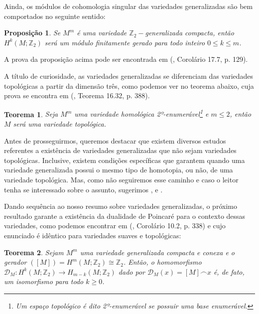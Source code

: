 \documentclass[12pt,oneside]{book} %
\newtheorem{teo}    {\hspace{0.5cm}Teorema}[chapter]
\newtheorem{prop}   {\hspace{0.5cm}Proposi\c c\~ao}[chapter]
\newcommand{\Z}{\mathbb{Z}}
\newcommand{\ccap}{\frown}
\begin{document}
\par Ainda, os módulos de cohomologia singular das variedades generalizadas são bem comportados no seguinte sentido:

\begin{prop}
Se $M^{m}$ é uma variedade $\Z_{2}-$generalizada compacta, então $H^{k}(M;\Z_{2})$ será um módulo finitamente gerado para todo inteiro $0\leq k\leq m$.
\end{prop}

\par A prova da proposição acima pode ser encontrada em (\cite{bredon_2}, Corolário 17.7, p. 129).

\par A título de curiosidade, as variedades generalizadas se diferenciam das variedades topológicas a partir da dimensão três, como podemos ver no teorema abaixo, cuja prova se encontra em (\cite{bredon_2}, Teorema 16.32, p. 388).

\begin{teo}
Seja $M^{m}$ uma variedade homológica 2º-enumerável\footnote{Um espaço topológico é dito 2º-enumerável se possuir uma base enumerável.} e $m\leq 2$, então $M$ será uma variedade topológica.
\end{teo}

\par Antes de prosseguirmos, queremos destacar que existem diversos estudos referentes a existência de variedades generalizadas que não sejam variedades topológicas. Inclusive, existem condições específicas que garantem quando uma variedade generalizada possui o mesmo tipo de homotopia, ou não, de uma variedade topológica. Mas, como não seguiremos esse caminho e caso o leitor tenha se interessado sobre o assunto, sugerimos \cite{mio_1}, \cite{mio_2} e \cite{gm-book}.

\par Dando sequência ao nosso resumo sobre variedades generalizadas, o próximo resultado garante a existência da dualidade de Poincaré para o contexto dessas variedades, como podemos encontrar em (\cite{bredon_2}, Corolário 10.2, p. 338) e cujo enunciado é idêntico para variedades suaves e topológicas:

\begin{teo}
Sejam $M^{m}$ uma variedade generalizada compacta e conexa e o gerador $([M])=H^{m}(M;\Z_{2})\cong\Z_{2}$. Então, o homomorfismo $\mathcal{D}_{M}:H^{k}(M;\Z_{2})\to H_{m-k}(M;\Z_{2})$ dado por $\mathcal{D}_{M}(x)=[M]\ccap x$ é, de fato, um isomorfismo para todo $k\geq 0$.
\end{teo}
\end{document}
